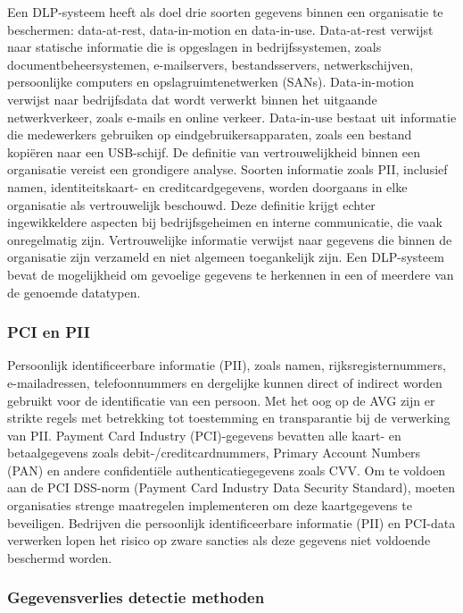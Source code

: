 Een DLP-systeem heeft als doel drie soorten gegevens binnen een organisatie te beschermen: data-at-rest, data-in-motion en data-in-use. 
Data-at-rest verwijst naar statische informatie die is opgeslagen in bedrijfssystemen, zoals documentbeheersystemen, e-mailservers, bestandsservers, netwerkschijven, 
persoonlijke computers en opslagruimtenetwerken (SANs). 
Data-in-motion verwijst naar bedrijfsdata dat wordt verwerkt binnen het uitgaande netwerkverkeer, zoals e-mails en online verkeer. 
Data-in-use bestaat uit informatie die medewerkers gebruiken op eindgebruikersapparaten, zoals een bestand kopiëren naar een USB-schijf. 
De definitie van vertrouwelijkheid binnen een organisatie vereist een grondigere analyse. 
Soorten informatie zoals PII, inclusief namen, identiteitskaart- en creditcardgegevens, worden doorgaans in elke organisatie als vertrouwelijk beschouwd.
Deze definitie krijgt echter ingewikkeldere aspecten bij bedrijfsgeheimen en interne communicatie, die vaak onregelmatig zijn. 
Vertrouwelijke informatie verwijst naar gegevens die binnen de organisatie zijn verzameld en niet algemeen toegankelijk zijn. 
Een DLP-systeem bevat de mogelijkheid om gevoelige gegevens te herkennen in een of meerdere van de genoemde datatypen.

\subsubsection{PCI en PII}

Persoonlijk identificeerbare informatie (PII), zoals namen, rijksregisternummers, e-mail\-adressen, telefoonnummers en dergelijke kunnen direct of indirect worden gebruikt voor de identificatie van een persoon. 
Met het oog op de AVG zijn er strikte regels met betrekking tot toestemming en transparantie bij de verwerking van PII. 
Payment Card Industry (PCI)-gegevens bevatten alle kaart- en betaalgegevens zoals debit-/creditcardnummers, Primary Account Numbers (PAN) en andere confidentiële authenticatiegegevens zoals CVV. 
Om te voldoen aan de PCI DSS-norm (Payment Card Industry Data Security Standard), 
moeten organisaties strenge maatregelen implementeren om deze kaartgegevens te beveiligen. 
Bedrijven die persoonlijk identificeerbare informatie (PII) en PCI-data verwerken lopen het risico op zware sancties als deze gegevens niet voldoende beschermd worden.

\subsubsection{Gegevensverlies detectie methoden}

